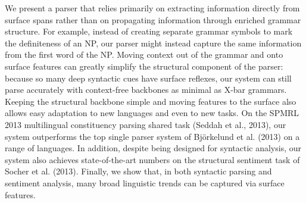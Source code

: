We present a parser that relies primarily on extracting information directly from surface spans rather than on propagating information through enriched grammar structure. For example, instead of creating separate grammar symbols to mark the definiteness of an NP, our parser might instead capture the same information from the first word of the NP. Moving context out of the grammar and onto surface features can greatly simplify the structural component of the parser: because so many deep syntactic cues have surface reflexes, our system can still parse accurately with context-free backbones as minimal as X-bar grammars. Keeping the structural backbone simple and moving features to the surface also allows easy adaptation to new languages and even to new tasks. On the SPMRL 2013 multilingual constituency parsing shared task (Seddah et al., 2013), our system outperforms the top single parser system of Björkelund et al. (2013) on a range of languages. In addition, despite being designed for syntactic analysis, our system also achieves state-of-the-art numbers on the structural sentiment task of Socher et al. (2013).  Finally, we show that, in both syntactic parsing and sentiment analysis, many broad linguistic trends can be captured via surface features.
